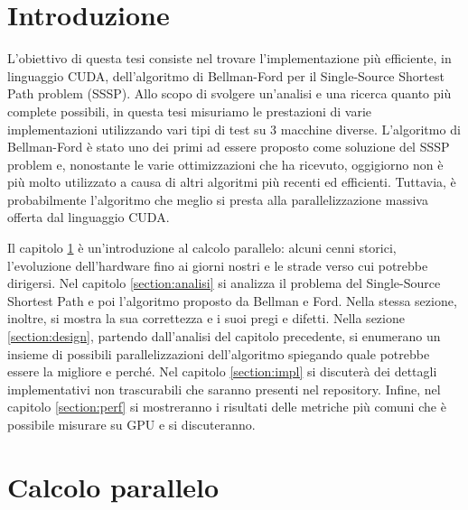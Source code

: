 \documentclass[12pt,a4paper]{book}
\begin{document}
	\chapter*{Introduzione}
	L'obiettivo di questa tesi consiste nel trovare l'implementazione più efficiente, in linguaggio CUDA, dell'algoritmo di Bellman-Ford per il Single-Source Shortest Path problem (SSSP). Allo scopo di svolgere un'analisi e una ricerca quanto più complete possibili, in questa tesi misuriamo le prestazioni di varie implementazioni utilizzando vari tipi di test su 3 macchine diverse. L'algoritmo di Bellman-Ford è stato uno dei primi ad essere proposto come soluzione del SSSP problem e, nonostante le varie ottimizzazioni che ha ricevuto, oggigiorno non è più molto utilizzato a causa di altri algoritmi più recenti ed efficienti. Tuttavia, è probabilmente l'algoritmo che meglio si presta alla parallelizzazione massiva offerta dal linguaggio CUDA.
	
	Il capitolo \ref{section:storia} è un'introduzione al calcolo parallelo: alcuni cenni storici, l'evoluzione dell'hardware fino ai giorni nostri e le strade verso cui potrebbe dirigersi. Nel capitolo \ref{section:analisi} si analizza il problema del Single-Source Shortest Path e poi l'algoritmo proposto da Bellman e Ford. Nella stessa sezione, inoltre, si mostra la sua correttezza e i suoi pregi e difetti. Nella sezione \ref{section:design}, partendo dall'analisi del capitolo precedente, si enumerano un insieme di possibili parallelizzazioni dell'algoritmo spiegando quale potrebbe essere la migliore e perché. Nel capitolo \ref{section:impl} si discuterà dei dettagli implementativi non trascurabili che saranno presenti nel repository. Infine, nel capitolo \ref{section:perf} si mostreranno i risultati delle metriche più comuni che è possibile misurare su GPU e si discuteranno.
	
	\chapter{Calcolo parallelo}
	\label{section:storia}
\end{document}

